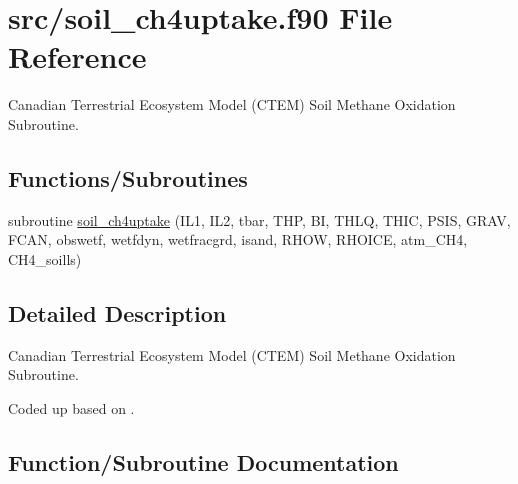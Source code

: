 \hypertarget{soil__ch4uptake_8f90}{}\section{src/soil\+\_\+ch4uptake.f90 File Reference}
\label{soil__ch4uptake_8f90}


Canadian Terrestrial Ecosystem Model (C\+T\+E\+M) Soil Methane Oxidation Subroutine.  


\subsection*{Functions/\+Subroutines}
\begin{DoxyCompactItemize}
\item 
subroutine \hyperlink{soil__ch4uptake_8f90_a6224a4d6e29f37e3d26f6eceeee72372}{soil\+\_\+ch4uptake} (I\+L1, I\+L2, tbar, T\+H\+P, B\+I, T\+H\+L\+Q, T\+H\+I\+C, P\+S\+I\+S, G\+R\+A\+V, F\+C\+A\+N, obswetf, wetfdyn, wetfracgrd, isand, R\+H\+O\+W, R\+H\+O\+I\+C\+E, atm\+\_\+\+C\+H4, C\+H4\+\_\+soills)
\end{DoxyCompactItemize}


\subsection{Detailed Description}
Canadian Terrestrial Ecosystem Model (C\+T\+E\+M) Soil Methane Oxidation Subroutine. 

Coded up based on \cite{Curry2007-du}. 

\subsection{Function/\+Subroutine Documentation}
\hypertarget{soil__ch4uptake_8f90_a6224a4d6e29f37e3d26f6eceeee72372}{}
